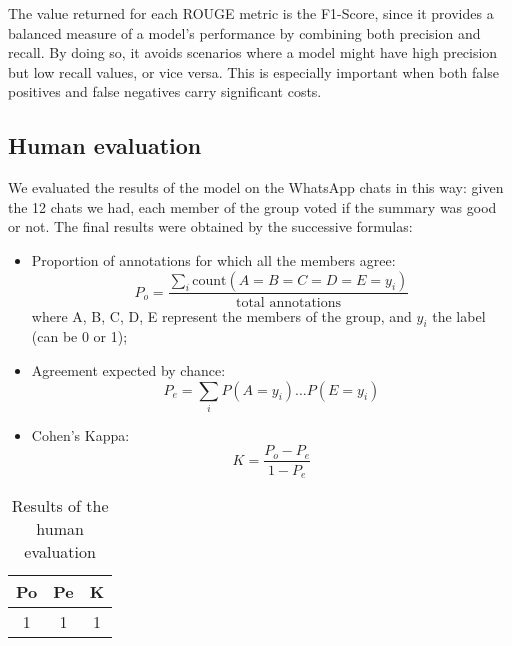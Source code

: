 \documentclass[10pt,twocolumn,letterpaper]{article}
\begin{document}
The value returned for each ROUGE metric is the F1-Score, since it provides a balanced measure of a model's performance by combining both precision and recall. By doing so, it avoids scenarios where a model might have high precision but low recall values, or vice versa. This is especially important when both false positives and false negatives carry significant costs.

\subsection{Human evaluation}
We evaluated the results of the model on the WhatsApp chats in this way: given the 12 chats we had, each member of the group voted if the summary was good or not.
The final results were obtained by the successive formulas:
\begin{itemize}
    \item Proportion of annotations for which all the members agree:
    \begin{equation}
        P_o = \frac{\sum_i \text{count}(A=B=C=D=E=y_i)}{\text{total annotations}}
    \end{equation}
    where A, B, C, D, E represent the members of the group, and $y_i$ the label (can be 0 or 1);
    \item Agreement expected by chance:
    \begin{equation}
        P_e = \sum_i P(A=y_i) \ldots P(E=y_i)
    \end{equation}
    \item Cohen's Kappa:
    \begin{equation}
        K = \frac{P_o - P_e}{1 - P_e}
    \end{equation}
\end{itemize}
\begin{table}[h!]
    \centering
    \begin{tabular}{|c|c|c|}
    \hline
    Po & Pe & K \\ 
    \hline
    1 & 1 & 1 \\
    \hline
\end{tabular}
\caption{Results of the human evaluation}
\label{table:example}
\end{table}




\end{document}
